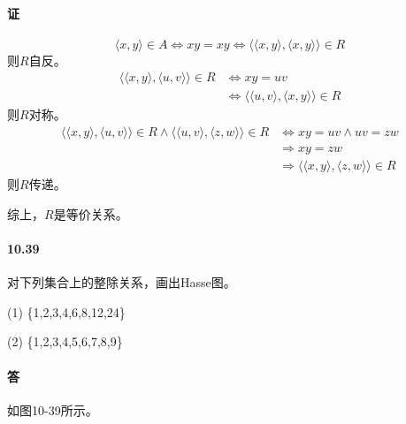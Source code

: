 \documentclass[UTF8]{ctexart}
\begin{document}
\paragraph{证}
    $$ \langle x,y \rangle \in A \Longleftrightarrow xy = xy \Longleftrightarrow \langle \langle x,y \rangle , \langle x,y \rangle \rangle \in R$$
    则$R$自反。
    \begin{align*}
        \langle \langle x,y \rangle , \langle u,v \rangle \rangle \in R & \Longleftrightarrow xy = uv \\
        & \Longleftrightarrow \langle \langle u,v \rangle , \langle x,y \rangle \rangle \in R
    \end{align*}
    则$R$对称。
    \begin{align*}
        \langle \langle x,y \rangle , \langle u,v \rangle \rangle \in R \land \langle \langle u,v \rangle , \langle z,w \rangle \rangle \in R & \Longleftrightarrow xy = uv \land uv = zw \\
        & \Longrightarrow xy = zw \\
        & \Longrightarrow \langle \langle x,y \rangle , \langle z,w \rangle \rangle \in R
    \end{align*}
    则$R$传递。

    综上，$R$是等价关系。

\paragraph{10.39} \label{10.39}
    对下列集合上的整除关系，画出Hasse图。
    
    (1) \{1,2,3,4,6,8,12,24\}

    (2) \{1,2,3,4,5,6,7,8,9\}

\paragraph{答}
    如图10-39所示。
\end{document}
